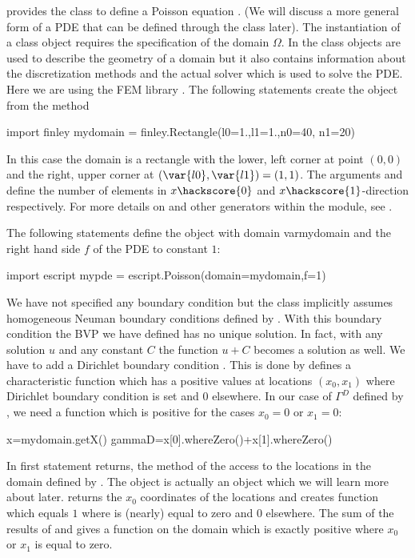 \escript provides the class \Poisson to define a Poisson equation .
(We will discuss a more general form of a PDE  
that can be defined through the \LinearPDE class later). The instantiation of
a \Poisson class object requires the specification of the domain $\Omega$. In \escript
the \Domain class objects are used to describe the geometry of a domain but it also
contains information about the discretization methods and the actual solver which is used
to solve the PDE. Here we are using the FEM library \finley {}. The following statements create the \Domain object  from the 
\finley method 
\begin{python}
import finley
mydomain = finley.Rectangle(l0=1.,l1=1.,n0=40, n1=20)
\end{python}
In this case the domain is a rectangle with the lower, left corner at point $(0,0)$ and
the right, upper corner at $(\var{l0},\var{l1})=(1,1)$.
The arguments  and  define the number of elements in $x\hackscore{0}$ and
$x\hackscore{1}$-direction respectively. For more details on  and
other \Domain generators within the \finley module,
see .

The following statements define the \Poisson object  with domain var{mydomain} and
the right hand side $f$ of the PDE to constant $1$: 
\begin{python}
import escript
mypde = escript.Poisson(domain=mydomain,f=1)
\end{python}
We have not specified any boundary condition but the 
\Poisson class implicitly assumes homogeneous Neuman boundary conditions  defined by . With this boundary 
condition the BVP we have defined has no unique solution. In fact, with any solution $u$
and any constant $C$ the function $u+C$ becomes a solution as well. We have to add 
a Dirichlet boundary condition . This is done 
by defines a characteristic function  
which has a positive values at locations $(x_0,x_1)$ where Dirichlet boundary condition is set
and $0$ elsewhere. In our case of $\Gamma^D$ defined by ,
we need a function which is positive for the cases $x_0=0$ or $x_1=0$:   
\begin{python}
x=mydomain.getX()
gammaD=x[0].whereZero()+x[1].whereZero()
\end{python}
In first statement returns, the method  of the \Domain {} access to the locations 
in the domain defined by . The object  is actually an \Data object
which we will learn more about later.  returns the $x_0$ coordinates of the locations and
 creates function which equals $1$ where  is (nearly) equal to zero 
and $0$ elsewhere. The sum of the results of  and  gives a function on the domain  which is exactly positive where $x_0$ or $x_1$ is equal to zero.

